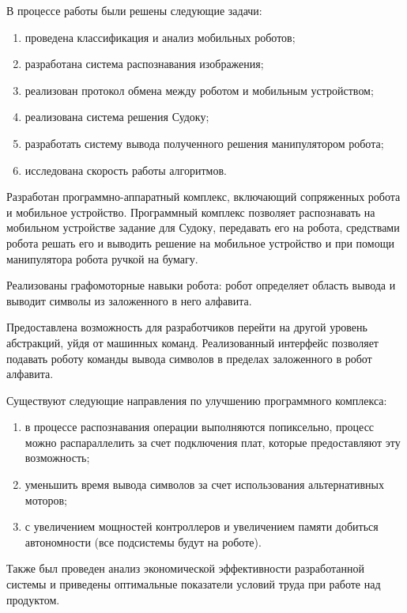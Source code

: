 \Conclusion %

В процессе работы были решены следующие задачи:

\begin{enumerate}
    \item проведена классификация и анализ мобильных роботов;
	\item разработана система распознавания изображения;
	\item реализован протокол обмена между роботом и мобильным устройством; 
	\item реализована система решения Судоку;
	\item разработать систему вывода полученного решения манипулятором робота;
	\item исследована скорость работы алгоритмов.
\end{enumerate}

Разработан программно-аппаратный комплекс, включающий сопряженных робота и мобильное устройство. Программный комплекс позволяет распознавать на мобильном устройстве задание для Судоку, передавать его на робота, средствами робота решать его и выводить решение на мобильное устройство и при помощи манипулятора робота ручкой на бумагу.

Реализованы графомоторные навыки робота: робот определяет область вывода и выводит символы из заложенного в него алфавита.

Предоставлена возможность для разработчиков перейти на другой уровень абстракций, уйдя от машинных команд. Реализованный интерфейс позволяет подавать роботу команды вывода символов в пределах заложенного в робот алфавита.

Существуют следующие направления по улучшению программного комплекса:

\begin{enumerate}
    \item в процессе распознавания операции выполняются попиксельно, процесс можно распараллелить за счет подключения плат, которые предоставляют эту возможность;
	\item уменьшить время вывода символов за счет использования альтернативных моторов;
	\item с увеличением мощностей контроллеров и увеличением памяти добиться автономности (все подсистемы будут на роботе).
\end{enumerate}


Также был проведен анализ экономической эффективности разработанной системы и приведены оптимальные показатели условий труда при работе над продуктом.



